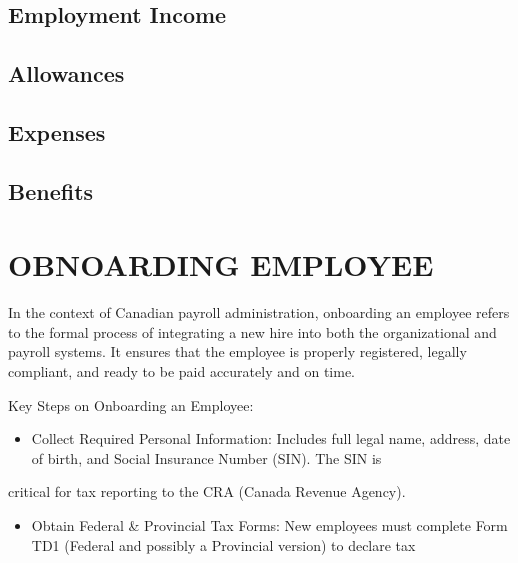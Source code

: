 \documentclass[letterpaper,10pt,english]{sphinxmanual}
\begin{document}
\section{Employment Income}
\label{\detokenize{compensation:employment-income}}

\section{Allowances}
\label{\detokenize{compensation:allowances}}

\section{Expenses}
\label{\detokenize{compensation:expenses}}

\section{Benefits}
\label{\detokenize{compensation:benefits}}
\sphinxstepscope


\chapter{OBNOARDING EMPLOYEE}
\label{\detokenize{onboarding_employee:obnoarding-employee}}\label{\detokenize{onboarding_employee::doc}}
\sphinxAtStartPar
In the context of Canadian payroll administration, onboarding an employee refers to the formal process of integrating a new hire into
both the organizational and payroll systems. It ensures that the employee is properly registered, legally compliant, and ready to be paid
accurately and on time.

\sphinxAtStartPar
Key Steps on Onboarding an Employee:
\begin{itemize}
\item {} 
\sphinxAtStartPar
Collect Required Personal Information: Includes full legal name, address, date of birth, and Social Insurance Number (SIN). The SIN is

\end{itemize}

\sphinxAtStartPar
critical for tax reporting to the CRA (Canada Revenue Agency).
\begin{itemize}
\item {} 
\sphinxAtStartPar
Obtain Federal \& Provincial Tax Forms: New employees must complete Form TD1 (Federal and possibly a Provincial version) to declare tax

\end{itemize}
\end{document}
